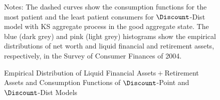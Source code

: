 \begin{figure}
\caption{Empirical Distribution of Liquid Financial
Assets${}+{}$Retirement Assets and Consumption Functions of
$\Discount$-Point and $\Discount$-Dist Models}
\label{CFuncDistSevenAndHistNetWorthLiqFinPlsRetPlot}
\footnotesize Notes: The dashed curves show the consumption functions
for the most patient and the least patient consumers for
$\Discount$-Dist model with KS aggregate process in the good
aggregate state. The blue (dark grey) and pink (light grey)
histograms show the empirical distributions of net worth and liquid
financial and retirement assets, respectively, in the Survey of
Consumer Finances of 2004.
\end{figure}
